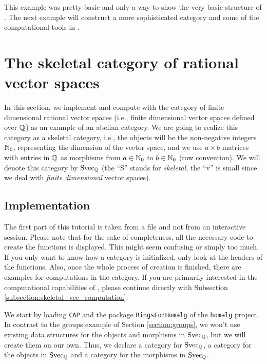 This example was pretty basic and only a way to show the very basic structure of \CapPkg. The next example
will construct a more sophisticated category and some of the computational tools in \CapPkg.


\section{The skeletal category of rational vector spaces}

In this section, we implement and compute with the category of finite dimensional rational vector spaces
(i.e., finite dimensional vector spaces defined over $\mathbb{Q}$) as an
example of an abelian category. We are going
to realize this category as a skeletal category, i.e., the objects will be the non-negative integers $\mathbb{N}_0$,
representing the dimension of the vector space, and we use $a \times b$ matrices with entries in $\mathbb{Q}$ as morphisms
from $a \in \mathbb{N}_0$ to $b \in \mathbb{N}_0$ (row convention). We will denote this category by $\mathrm{Svec}_{\mathbb{Q}}$
(the ``S'' stands for \emph{skeletal}, the ``v'' is small since we deal with \emph{finite dimensional} vector spaces).

\subsection{Implementation}

The first part of this tutorial is taken from a file and not from
an interactive session. Please note that for the sake of completeness, all the necessary code to create the
functions is displayed. This might seem confusing or simply too much. If you only want to know how a \CapPkg category
is initialized, only look at the headers of the functions. Also, once the whole process of creation is finished,
there are examples for computations in the category. If you are primarily interested in the computational capabilities of \CapPkg, please
continue directly with Subsection \ref{subsection:skeletal_vec_computation}.



We start by loading \texttt{CAP} and the package \texttt{RingsForHomalg} of the \texttt{homalg} project.
In contrast to the groups example of Section \ref{section:groups}, we won't use existing data structures for the objects and morphisms
in $\mathrm{Svec}_{\mathbb{Q}}$, but we will create them on our own. Thus, we declare
a \GAP category for $\mathrm{Svec}_{\mathbb{Q}}$, a \GAP category for the objects in $\mathrm{Svec}_{\mathbb{Q}}$ and a \GAP category for the morphisms in $\mathrm{Svec}_{\mathbb{Q}}$.

